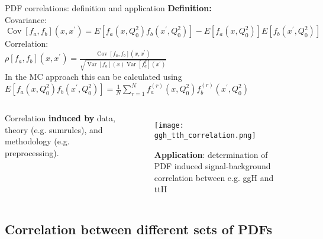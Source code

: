 \begin{frame}[t]{PDF correlations: definition and application}
  \textbf{Definition:}\\[0.3cm]
  Covariance: \\
  $\operatorname{Cov}\left[f_a, f_b\right]\left(x, x^{\prime}\right)=E\left[f_a\left(x, Q_0^2\right) f_b\left(x^{\prime}, Q_0^2\right)\right]-E\left[f_a\left(x, Q_0^2\right)\right] E\left[f_b\left(x^{\prime}, Q_0^2\right)\right]$\\[0.3cm]

  Correlation: \\
  $\rho\left[f_a, f_b\right]\left(x, x^{\prime}\right)=\frac{\operatorname{Cov}\left[f_a, f_b\right]\left(x, x^{\prime}\right)}{\sqrt{\operatorname{Var}\left[f_a\right](x) \operatorname{Var}\left[f_a^q\right]\left(x^{\prime}\right)}}$\\[0.3cm]

  In the MC approach this can be calculated using\\
  $E \left[f_a\left(x, Q_0^2\right) f_b\left(x^{\prime}, Q_0^2\right)\right]=\frac{1}{N} \sum_{r=1}^N f_a^{(r)}\left(x, Q_0^2\right) f_b^{(r)}\left(x^{\prime}, Q_0^2\right)$\\[0.3cm]

  \begin{columns}[t]
      Correlation {\bf induced by} data, theory (e.g. sumrules), and methodology (e.g. preprocessing).\\[0.3cm]

      \vspace*{-3cm}
      \begin{figure}
        \texttt{[image: ggh\_tth\_correlation.png]}
        \caption*{{\bf Application}: determination of PDF induced signal-background correlation between e.g. ggH and ttH}
    \end{figure}
  \end{columns}
\end{frame}

\subsection{Correlation between different sets of PDFs}

